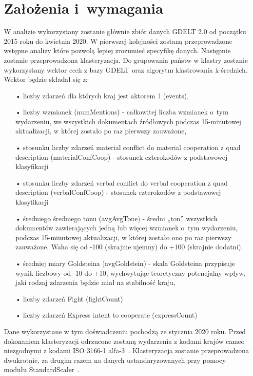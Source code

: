 \documentclass[11pt]{report}
\begin{document}
    \section{Założenia i~wymagania}\label{sec:założenia-i-wymagania}
    W analizie wykorzystany zostanie głównie zbiór danych GDELT 2.0 od początku 2015 roku do kwietnia 2020.
    W pierwszej kolejności zostaną przeprowadzone wstępne analizy które pozwolą lepiej zrozumieć specyfikę danych.
    Następnie zostanie przeprowadzona klasteryzacja.
    Do grupowania państw w klastry zostanie wykorzystany wektor cech z bazy GDELT oraz algorytm klastrowania k-średnich.
    Wektor będzie składał się z:
    \begin{enumerate}
        \item[•] liczby zdarzeń dla których kraj jest aktorem 1 (events),
        \item[•] liczby wzmianek (numMentions) - całkowitej liczba wzmianek o~tym wydarzeniu, we wszystkich dokumentach źródłowych podczas 15-minutowej aktualizacji, w której zostało po raz pierwszy zauważone,
        \item[•] stosunku liczby zdarzeń material conflict do material cooperation z quad description (materialConfCoop) - stosunek czterokodów z podstawowej klasyfikacji
        \item[•] stosunku liczby zdarzeń verbal conflict do verbal cooperation z quad description (verbalConfCoop) - stosunek czterokodów z podstawowej klasyfikacji
        \item[•] średniego średniego tonu (avgAvgTone) - średni „ton” wszystkich dokumentów zawierających jedną lub więcej wzmianek o~tym wydarzeniu, podczas 15-minutowej aktualizacji, w której zostało ono po raz pierwszy zauważone. Waha się od -100 (skrajnie ujemny) do +100 (skrajnie dodatni).
        \item[•] średniej miary Goldsteina (avgGoldstein) - skala Goldsteina przypisuje wynik liczbowy od -10 do +10, wychwytując teoretyczny potencjalny wpływ, jaki rodzaj zdarzenia będzie miał na stabilność kraju,
        \item[•] liczby zdarzeń Fight (fightCount)
        \item[•] liczby zdarzeń Express intent to cooperate (expressCount)
    \end{enumerate}
    Dane wykorzystane w tym doświadczeniu pochodzą ze stycznia 2020 roku.
    Przed dokonaniem klasteryzacji odrzucone zostaną wydarzenia z kodami krajów cameo niezgodnymi z kodami ISO 3166-1 alfa-3~\cite{iso_alfa3}.
    Klasteryzacja zostanie przeprowadzona dwukrotnie, za drugim razem na danych ustandaryzowanych przy pomocy modułu StandardScaler~\cite{standardScaler}.
\end{document}

